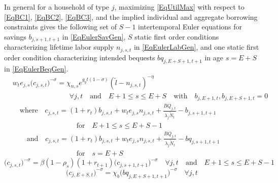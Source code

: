 \documentclass[letterpaper,12pt]{article}
\theoremstyle{definition}
\begin{document}
\begin{spacing}{1.5}
    In general for a household of type $j$, maximizing \eqref{EqUtilMax} with respect to \eqref{EqBC1}, \eqref{EqBC2}, \eqref{EqBC3}, and the implied individual and aggregate borrowing constraints gives the following set of $S-1$ intertemporal Euler equations for savings $b_{j,s+1,t+1}$ in \eqref{EqEulerSavGen}, $S$ static first order conditions characterizing lifetime labor supply $n_{j,s,t}$ in \eqref{EqEulerLabGen}, and one static first order condition characterizing intended bequests $bq_{j,E+S+1,t+1}$ in age $s=E+S$ in \eqref{EqEulerBeqGen}.
    \begin{equation}\label{EqEulerLabGen}
      \begin{split}
        &w_t e_{j,s}\bigl(c_{j,s,t}\bigr)^{-\sigma} = \chi_{n,s}e^{g_y t(1-\sigma)}(\tilde{l} - n_{j,s,t})^{-\eta} \\
        &\quad\quad\quad\quad\quad\quad\quad\quad\forall j,t \quad\text{and}\quad E+1\leq s\leq E+S \quad\text{with}\quad b_{j,E+1,t},b_{j,E+S+1,t}=0 \\
        &\quad\text{where}\quad c_{j,s,t} = \left(1+r_t\right)b_{j,s,t} + w_t e_{j,s}n_{j,s,t} + \frac{BQ_{j,t}}{\lambda_j\tilde{N}_t} - b_{j,s+1,t+1} \\
        &\quad\quad\quad\quad\quad\quad\quad\quad\quad\text{for}\quad E+1\leq s\leq E+S-1 \\
        &\quad\quad\text{and}\quad c_{j,s,t} = \left(1+r_t\right)b_{j,s,t} + w_t e_{j,s}n_{j,s,t} + \frac{BQ_{j,t}}{\lambda_j\tilde{N}_t} - bq_{j,s+1,t+1} \\
        &\quad\quad\quad\quad\quad\quad\quad\quad\quad\text{for}\quad s=E+S
      \end{split}
    \end{equation}
    \begin{equation}\label{EqEulerSavGen}
      \bigl(c_{j,s,t}\bigr)^{-\sigma} = \beta(1-\rho_s)(1+r_{t+1})\bigl(c_{j,s+1,t+1}\bigr)^{-\sigma}\quad\forall j,t \quad\text{and}\quad E+1\leq s\leq E+S-1
    \end{equation}
    \begin{equation}\label{EqEulerBeqGen}
      \bigl(c_{j,E+S,t}\bigr)^{-\sigma} = \chi_b\bigl(bq_{j,E+S+1,t+1}\bigr)^{-\sigma} \quad\forall j,t
    \end{equation}


\end{spacing}
\end{document}
